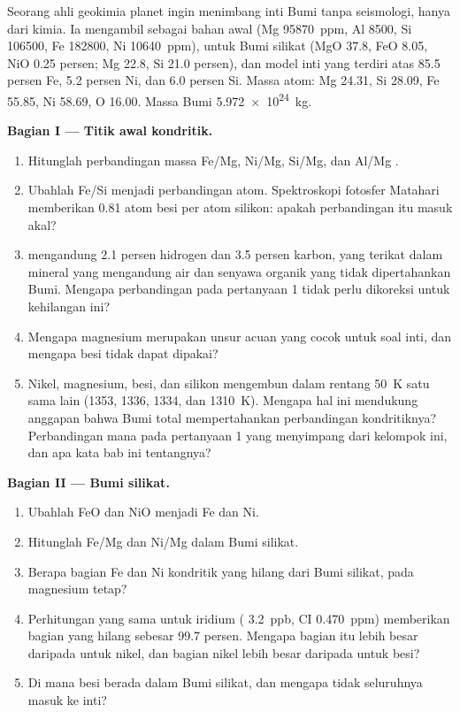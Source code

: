 \begin{problem}
\label{pb:b2:elements-in-the-earth:1}
Seorang ahli geokimia planet ingin menimbang inti Bumi tanpa seismologi, hanya dari
kimia. Ia mengambil  sebagai bahan awal
(Mg \qty{95870}{ppm}, Al 8500, Si \num{106500}, Fe \num{182800},
Ni \qty{10640}{ppm}),  untuk Bumi silikat (MgO 37.8, FeO
8.05, NiO 0.25 persen; Mg 22.8, Si 21.0 persen), dan model inti yang terdiri atas 85.5
persen Fe, 5.2 persen Ni, dan 6.0 persen Si. Massa atom: Mg 24.31,
Si 28.09, Fe 55.85, Ni 58.69, O 16.00. Massa Bumi
\qty{5.972e24}{kg}.

\medskip\noindent\textbf{Bagian I --- Titik awal kondritik.}
\begin{enumerate}
\item Hitunglah perbandingan massa Fe/Mg, Ni/Mg, Si/Mg, dan Al/Mg .
\item Ubahlah Fe/Si menjadi perbandingan atom. Spektroskopi fotosfer Matahari
memberikan 0.81 atom besi per atom silikon: apakah perbandingan itu masuk akal?
\item {} mengandung 2.1 persen hidrogen dan 3.5 persen karbon, yang terikat dalam
mineral yang mengandung air dan senyawa organik yang tidak dipertahankan Bumi. Mengapa
perbandingan pada pertanyaan 1 tidak perlu dikoreksi untuk kehilangan ini?
\item Mengapa magnesium merupakan unsur acuan yang cocok untuk soal inti, dan
mengapa besi tidak dapat dipakai?
\item Nikel, magnesium, besi, dan silikon mengembun dalam rentang \qty{50}{K} satu sama
lain (1353, 1336, 1334, dan \qty{1310}{K}). Mengapa hal ini mendukung
anggapan bahwa Bumi total mempertahankan perbandingan kondritiknya? Perbandingan mana pada
pertanyaan 1 yang menyimpang dari kelompok ini, dan apa kata bab ini tentangnya?
\end{enumerate}

\noindent\textbf{Bagian II --- Bumi silikat.}
\begin{enumerate}[resume]
\item Ubahlah FeO dan NiO  menjadi Fe dan Ni.
\item Hitunglah Fe/Mg dan Ni/Mg dalam Bumi silikat.
\item Berapa bagian Fe dan Ni kondritik yang hilang dari Bumi
silikat, pada magnesium tetap?
\item Perhitungan yang sama untuk iridium ( \qty{3.2}{ppb}, CI
\qty{0.470}{ppm}) memberikan bagian yang hilang sebesar 99.7 persen. Mengapa bagian itu lebih besar
daripada untuk nikel, dan bagian nikel lebih besar daripada untuk besi?
\item Di mana besi berada dalam Bumi silikat, dan mengapa tidak seluruhnya masuk ke
inti?
\end{enumerate}


\end{problem}
